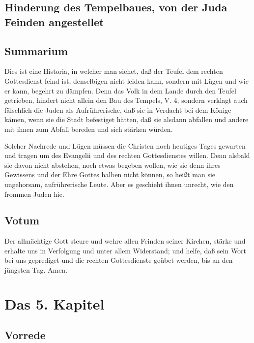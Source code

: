 \section{Hinderung des Tempelbaues, von der Juda Feinden angestellet}


\section{Summarium}

Dies ist eine Historia, in welcher man siehet, daß der Teufel dem rechten Gottesdienst feind ist, denselbigen nicht leiden kann, sondern mit Lügen und wie er kann, begehrt zu dämpfen. Denn das Volk in dem Lande durch den Teufel getrieben, hindert nicht allein den Bau des Tempels, V. 4, sondern verklagt auch fälschlich die Juden als Aufrührerische, daß sie in Verdacht bei dem Könige kämen, wenn sie die Stadt befestiget hätten, daß sie alsdann abfallen und andere mit ihnen zum Abfall bereden und sich stärken würden.

Solcher Nachrede und Lügen müssen die Christen noch heutiges Tages gewarten und tragen um des Evangelii und des rechten Gottesdienstes willen. Denn alsbald sie davon nicht abstehen, noch etwas begeben wollen, wie sie denn ihres Gewissens und der Ehre Gottes halben nicht können, so heißt man sie ungehorsam, aufrührerische Leute. Aber es geschieht ihnen unrecht, wie den frommen Juden hie.

\section{Votum}

Der allmächtige Gott steure und wehre allen Feinden seiner Kirchen, stärke und erhalte uns in Verfolgung und unter allem Widerstand; und helfe, daß sein Wort bei uns geprediget und die rechten Gottesdienste geübet werden, bis an den jüngsten Tag. Amen.

\chapter{Das 5. Kapitel}

\section{Vorrede}

